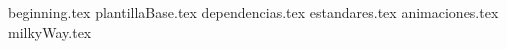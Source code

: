 \documentclass[11pt,oneside]{book}%
\begin{document}
	\frontmatter
		\tableofcontents
		{beginning.tex} 
	\mainmatter
%	
	{plantillaBase.tex}
	{dependencias.tex}
	{estandares.tex}
	{animaciones.tex}
	{milkyWay.tex}
	
\end{document}
